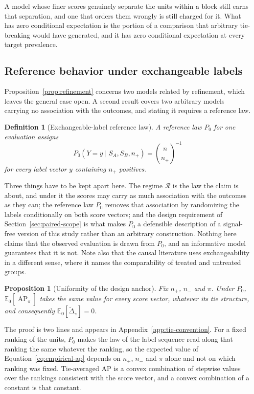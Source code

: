\documentclass[11pt]{article}
\newcommand{\AP}{\operatorname{AP}}
\newcommand{\Regime}{\mathcal{R}}
\newcommand{\E}{\mathbb{E}}
\newcommand{\APta}{\widetilde{\AP}}
\newcommand{\Dta}{\widetilde{\Delta}}
\newtheorem{definition}{Definition}
\newtheorem{proposition}{Proposition}
\theoremstyle{remark}
\begin{document}
A model whose finer scores genuinely separate the units within a block still earns that separation, and one that orders them wrongly is still charged for it. What has zero conditional expectation is the portion of a comparison that arbitrary tie-breaking would have generated, and it has zero conditional expectation at every target prevalence.

\subsection{Reference behavior under exchangeable labels}
\label{sec:reference-law}

Proposition~\ref{prop:refinement} concerns two models related by refinement, which leaves the general case open. A second result covers two arbitrary models carrying no association with the outcomes, and stating it requires a reference law.

\begin{definition}[Exchangeable-label reference law]
\label{def:label-condition}
A reference law $P_0$ for one evaluation assigns
\[
P_0\left(Y=y\mid S_A,S_B,n_+\right)
=
\binom{n}{n_+}^{-1}
\]
for every label vector $y$ containing $n_+$ positives.
\end{definition}

Three things have to be kept apart here. The regime $\Regime$ is the law the claim is about, and under it the scores may carry as much association with the outcomes as they can; the reference law $P_0$ removes that association by randomizing the labels conditionally on both score vectors; and the design requirement of Section~\ref{sec:paired-scope} is what makes $P_0$ a defensible description of a signal-free version of this study rather than an arbitrary construction. Nothing here claims that the observed evaluation is drawn from $P_0$, and an informative model guarantees that it is not. Note also that the causal literature uses exchangeability in a different sense, where it names the comparability of treated and untreated groups.

\begin{proposition}[Uniformity of the design anchor]
\label{prop:uniformity}
Fix $n_+$, $n_-$ and $\pi$. Under $P_0$, $\E_0[\APta_\pi]$ takes the same value for every score vector, whatever its tie structure, and consequently $\E_0[\Dta_\pi]=0$.
\end{proposition}

The proof is two lines and appears in Appendix~\ref{app:tie-convention}. For a fixed ranking of the units, $P_0$ makes the law of the label sequence read along that ranking the same whatever the ranking, so the expected value of Equation~\eqref{eq:empirical-ap} depends on $n_+$, $n_-$ and $\pi$ alone and not on which ranking was fixed. Tie-averaged AP is a convex combination of stepwise values over the rankings consistent with the score vector, and a convex combination of a constant is that constant.
\end{document}
